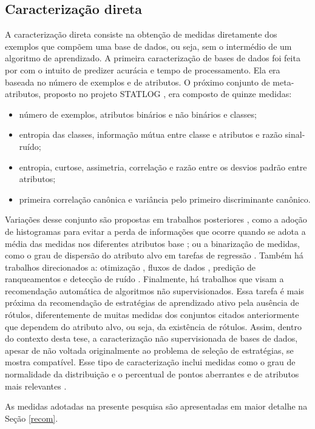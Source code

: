 \subsection{Caracterização direta}\label{direta}
A caracterização direta consiste na obtenção de medidas diretamente dos exemplos
que compõem uma base de dados, ou seja, sem o intermédio de um algoritmo
de aprendizado.
A primeira caracterização de bases de dados foi feita por \cite{conf/ijcai/RendellST87}
com o intuito de predizer acurácia e tempo de processamento.
Ela era baseada no número de exemplos e de atributos.
O próximo conjunto de meta-atributos, proposto no projeto STATLOG
\citep{brazdil1994analysis}, era composto de quinze medidas:
\begin{itemize}
 \item número de exemplos, atributos binários e não binários e classes;
 \item entropia das classes, informação mútua entre classe e atributos e razão sinal-ruído;
 \item entropia, curtose, assimetria, correlação e razão entre os desvios padrão entre atributos;
 \item primeira correlação canônica e variância pelo primeiro discriminante canônico.
\end{itemize}
Variações desse conjunto são propostas em trabalhos posteriores
\citep{books/daglib/0022052},
como a adoção de histogramas para evitar a perda de informações que ocorre quando
se adota a média das medidas nos diferentes atributos base \citep{kalousis2002algorithm};
ou a binarização de medidas, como o grau de dispersão do atributo alvo em
tarefas de regressão \citep{journals/ijon/GomesPSRC12}.
Também há trabalhos direcionados a: otimização \citep{journals/ijhis/KandaCHS11},
fluxos de dados \citep{journals/ijon/RossiCSS14}, predição de ranqueamentos
\citep{conf/iberamia/SouzaCS10} e detecção de ruído \citep{Garcia2015}.
Finalmente, há trabalhos que visam a recomendação automática de algoritmos
não supervisionados.
Essa tarefa é mais próxima da recomendação de estratégias de aprendizado ativo
pela ausência de rótulos, diferentemente de muitas medidas dos conjuntos
citados anteriormente que dependem do atributo alvo, ou seja,
da existência de rótulos.
Assim, dentro do contexto desta tese, a caracterização não supervisionada
de bases de dados, apesar de não voltada originalmente ao problema
de seleção de estratégias, se mostra compatível.
Esse tipo de caracterização inclui medidas como o grau de normalidade da distribuição e
o percentual de pontos aberrantes e de atributos mais relevantes
\citep{conf/ijcnn/SoutoPSACLS08,Ferrari2015181}.


As medidas adotadas na presente pesquisa são apresentadas em maior detalhe na
Seção \ref{recom}.





